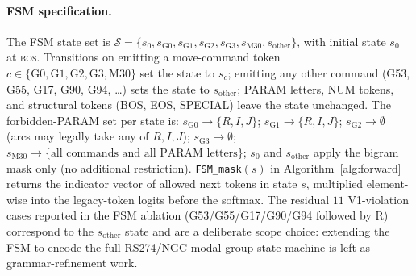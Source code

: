\documentclass[11pt,a4paper]{article}
\begin{document}
\paragraph{FSM specification.} The FSM state set is $\mathcal{S}=\{s_0, s_{\text{G0}}, s_{\text{G1}}, s_{\text{G2}}, s_{\text{G3}}, s_{\text{M30}}, s_{\text{other}}\}$, with initial state $s_0$ at \textsc{bos}. Transitions on emitting a move-command token $c\in\{\text{G0},\text{G1},\text{G2},\text{G3},\text{M30}\}$ set the state to $s_c$; emitting any other command (G53, G55, G17, G90, G94, \ldots) sets the state to $s_{\text{other}}$; PARAM letters, NUM tokens, and structural tokens (BOS, EOS, SPECIAL) leave the state unchanged. The forbidden-PARAM set per state is: $s_{\text{G0}}\!\to\!\{R, I, J\}$; $s_{\text{G1}}\!\to\!\{R, I, J\}$; $s_{\text{G2}}\!\to\!\emptyset$ (arcs may legally take any of $R, I, J$); $s_{\text{G3}}\!\to\!\emptyset$; $s_{\text{M30}}\!\to\!\{\text{all commands and all PARAM letters}\}$; $s_0$ and $s_{\text{other}}$ apply the bigram mask only (no additional restriction). \texttt{FSM\_mask}$(s)$ in Algorithm~\ref{alg:forward} returns the indicator vector of allowed next tokens in state $s$, multiplied element-wise into the legacy-token logits before the softmax. The residual $11$ V1-violation cases reported in the FSM ablation (G53/G55/G17/G90/G94 followed by R) correspond to the $s_{\text{other}}$ state and are a deliberate scope choice: extending the FSM to encode the full RS274/NGC modal-group state machine is left as grammar-refinement work.
\end{document}
